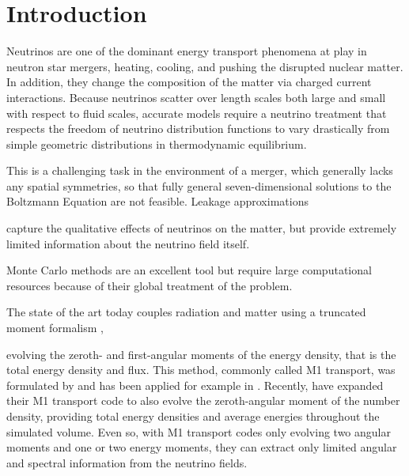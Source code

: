 \documentclass[aps,floatfix,prd,superscriptaddress,twocolumn]{revtex4-1}
\newcommand{\todo}[1]{\marginpar{\tiny{\textcolor{red}{#1}}}}
\renewcommand\todo[1]{} %
\begin{document}
\maketitle

\section{Introduction}
Neutrinos are one of the dominant energy transport phenomena at play in
neutron star mergers, heating, cooling, and pushing the disrupted nuclear
matter.
In addition, they change the composition of the matter via charged current
interactions.
Because neutrinos scatter over length scales both large and small with
respect to fluid scales, accurate models require a neutrino treatment that
respects the freedom of neutrino distribution functions to vary
drastically from simple geometric distributions in thermodynamic equilibrium.

This is a challenging task in the environment of a merger,
which generally lacks any spatial symmetries, so that fully general
seven-dimensional solutions to the Boltzmann Equation are not feasible.
Leakage approximations
\citep{deat2013-leakage, pere2016-asl, radi2016-dynamical}
\todo{cite others}
capture the qualitative effects of neutrinos on the matter, but
provide extremely limited information about the neutrino field itself.
\todo{discuss mc more clearly}
Monte Carlo methods \citep{abdi2012-monte_carlo,rich2015-monte_carlo}
are an excellent tool but require large computational resources because of
their global treatment of the problem.

The state of the art today couples radiation and matter using a truncated
moment formalism
\citep{shib2011-truncated_moment, fouc2015-m1_nsbh, fouc2016-m1_nsns,
  just2015-m1_code},
\todo{cite others}
evolving the zeroth- and first-angular moments of the energy density,
that is the total energy density and flux.
This method, commonly called M1 transport, was formulated by
\cite{thor1981-truncated_moment, shib2011-truncated_moment}
and has been applied for example in \cite{ramp2002-truncated_moment,
  card2013-truncated_moment, fouc2015-m1_nsbh, ocon2015-gr1d_with_nu}.
Recently, \cite{fouc2016-m1_evolve_n} have expanded their M1 transport code
to also evolve the zeroth-angular moment of the number density,
providing total energy densities and average energies throughout the
simulated volume.
Even so, with M1 transport codes only evolving two angular moments
and one or two energy moments,
they can extract only limited angular and spectral information
from the neutrino fields.
\end{document}
